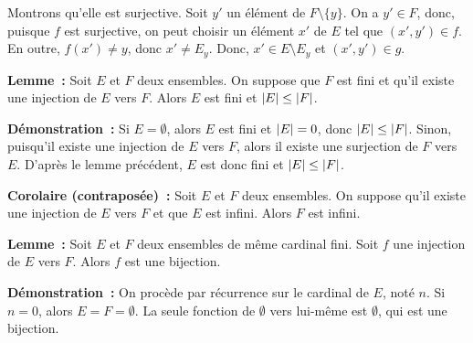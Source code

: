    Montrons qu'elle est surjective. 
    Soit $y'$ un élément de $F \setminus \lbrace y \rbrace$. 
    On a $y' \in F$, donc, puisque $f$ est surjective, on peut choisir un élément $x'$ de $E$ tel que $(x',y') \in f$. 
    En outre, $f(x') \neq y$, donc $x' \neq E_y$.
    Donc, $x' \in E \setminus E_y$ et $(x',y') \in g$. 

    \done

\medskip

\noindent\textbf{Lemme :} Soit $E$ et $F$ deux ensembles. 
    On suppose que $F$ est fini et qu'il existe une injection de $E$ vers $F$.
    Alors $E$ est fini et $\left\lvert E \right\rvert \leq \left\lvert F \right\rvert$.

\medskip

\noindent\textbf{Démonstration :} Si $E = \emptyset$, alors $E$ est fini et $\left\lvert E \right\rvert = 0$, donc $\left\lvert E \right\rvert \leq \left\lvert F \right\rvert$.
    Sinon, puisqu'il existe une injection de $E$ vers $F$, alors il existe une surjection de $F$ vers $E$.
    D'après le lemme précédent, $E$ est donc fini et $\left\lvert E \right\rvert \leq \left\lvert F \right\rvert$.

    \done

\medskip

\noindent\textbf{Corolaire (contraposée) :} Soit $E$ et $F$ deux ensembles. 
    On suppose qu'il existe une injection de $E$ vers $F$ et que $E$ est infini.
    Alors $F$ est infini.

\medskip

\noindent\textbf{Lemme :} Soit $E$ et $F$ deux ensembles de même cardinal fini. 
    Soit $f$ une injection de $E$ vers $F$.
    Alors $f$ est une bijection. 

\medskip

\noindent\textbf{Démonstration :} On procède par récurrence sur le cardinal de $E$, noté $n$.
    Si $n = 0$, alors $E = F = \emptyset$. 
    La seule fonction de $\emptyset$ vers lui-même est $\emptyset$, qui est une bijection. 
    
